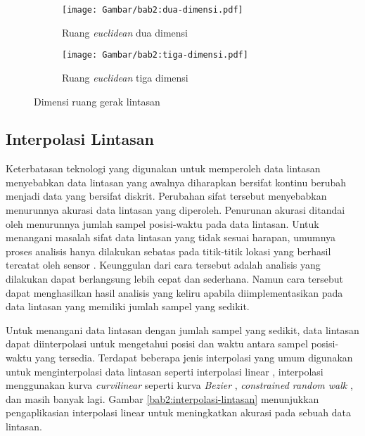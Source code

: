 \iffalse

Pada skripsi ini, entitas yang diamati akan bergerak dalam ruang \textit{euclidean} dua dimensi yang disimbolkan sebagai $\mathbb{R}^2$\lionov{ini harusnya ada di batasan}.

\fi

\begin{figure}[b!]
    \centering
    \begin{subfigure}[h]{0.35\textwidth}
        \centering
        \texttt{[image: Gambar/bab2:dua-dimensi.pdf]}
        \caption{Ruang \textit{euclidean} dua dimensi}
        \label{bab2:dua-dimensi}
    \end{subfigure} \hspace{2cm}
    \begin{subfigure}[h]{0.35\textwidth}
        \centering
        \texttt{[image: Gambar/bab2:tiga-dimensi.pdf]}
        \caption{Ruang \textit{euclidean} tiga dimensi}
        \label{bab2:tiga-dimensi}
    \end{subfigure}
    \caption{Dimensi ruang gerak lintasan}
    \label{bab2:ruang-gerak}
\end{figure}

\subsection{Interpolasi Lintasan}
\label{subsec:interpolasi}

Keterbatasan teknologi yang digunakan untuk memperoleh data lintasan menyebabkan data lintasan yang awalnya diharapkan bersifat kontinu berubah menjadi data yang bersifat diskrit. Perubahan sifat tersebut menyebabkan menurunnya akurasi data lintasan yang diperoleh. Penurunan akurasi ditandai oleh menurunnya jumlah sampel posisi-waktu pada data lintasan. Untuk menangani masalah sifat data lintasan yang tidak sesuai harapan, umumnya proses analisis hanya dilakukan sebatas pada titik-titik lokasi yang berhasil tercatat oleh sensor \cite{wiratma:trajectory}. Keunggulan dari cara tersebut adalah analisis yang dilakukan dapat berlangsung lebih cepat dan sederhana. Namun cara tersebut dapat menghasilkan hasil analisis yang keliru apabila diimplementasikan pada data lintasan yang memiliki jumlah sampel yang sedikit.

Untuk menangani data lintasan dengan jumlah sampel yang sedikit, data lintasan dapat diinterpolasi untuk mengetahui posisi dan waktu antara sampel posisi-waktu yang tersedia. Terdapat beberapa jenis interpolasi yang umum digunakan untuk menginterpolasi data lintasan seperti interpolasi linear \cite{wiratma:trajectory}, interpolasi menggunakan kurva \textit{curvilinear} seperti kurva \textit{Bezier} \cite{tremblay:02:curvilinear}, \textit{constrained random walk} \cite{wentz:02:constrained-random-walk}, dan masih banyak lagi. Gambar \ref{bab2:interpolasi-lintasan} menunjukkan pengaplikasian interpolasi linear untuk meningkatkan akurasi pada sebuah data lintasan.

